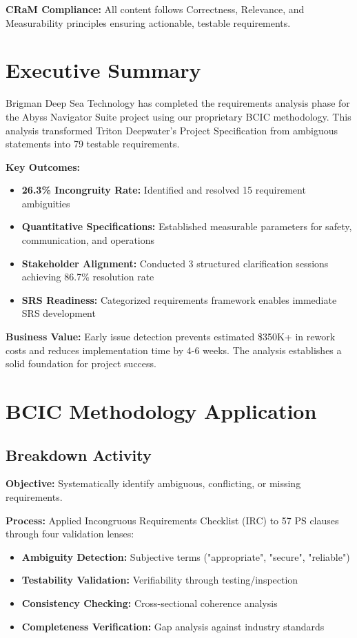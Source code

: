 \documentclass[12pt,a4paper]{article}
\begin{document}
\textbf{CRaM Compliance:} All content follows Correctness, Relevance, and Measurability principles ensuring actionable, testable requirements.

\newpage

\section{Executive Summary}
\label{sec:executive}

Brigman Deep Sea Technology has completed the requirements analysis phase for the Abyss Navigator Suite project using our proprietary BCIC methodology. This analysis transformed Triton Deepwater's Project Specification from ambiguous statements into 79 testable requirements.

\textbf{Key Outcomes:}
\begin{itemize}
\item \textbf{26.3\% Incongruity Rate:} Identified and resolved 15 requirement ambiguities
\item \textbf{Quantitative Specifications:} Established measurable parameters for safety, communication, and operations
\item \textbf{Stakeholder Alignment:} Conducted 3 structured clarification sessions achieving 86.7\% resolution rate
\item \textbf{SRS Readiness:} Categorized requirements framework enables immediate SRS development
\end{itemize}

\textbf{Business Value:} Early issue detection prevents estimated \$350K+ in rework costs and reduces implementation time by 4-6 weeks. The analysis establishes a solid foundation for project success.

\newpage

\section{BCIC Methodology Application}
\label{sec:bcic}

\subsection{Breakdown Activity}
\textbf{Objective:} Systematically identify ambiguous, conflicting, or missing requirements.

\textbf{Process:} Applied Incongruous Requirements Checklist (IRC) to 57 PS clauses through four validation lenses:
\begin{itemize}
\item \textbf{Ambiguity Detection:} Subjective terms ("appropriate", "secure", "reliable")
\item \textbf{Testability Validation:} Verifiability through testing/inspection
\item \textbf{Consistency Checking:} Cross-sectional coherence analysis
\item \textbf{Completeness Verification:} Gap analysis against industry standards
\end{itemize}
\end{document}
